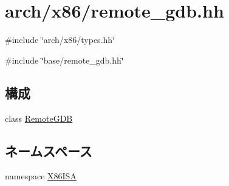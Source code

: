 \hypertarget{arch_2x86_2remote__gdb_8hh}{
\section{arch/x86/remote\_\-gdb.hh}
\label{arch_2x86_2remote__gdb_8hh}
}
{\ttfamily \#include \char`\"{}arch/x86/types.hh\char`\"{}}\par
{\ttfamily \#include \char`\"{}base/remote\_\-gdb.hh\char`\"{}}\par
\subsection*{構成}
\begin{DoxyCompactItemize}
\item 
class \hyperlink{classX86ISA_1_1RemoteGDB}{RemoteGDB}
\end{DoxyCompactItemize}
\subsection*{ネームスペース}
\begin{DoxyCompactItemize}
\item 
namespace \hyperlink{namespaceX86ISA}{X86ISA}
\end{DoxyCompactItemize}
